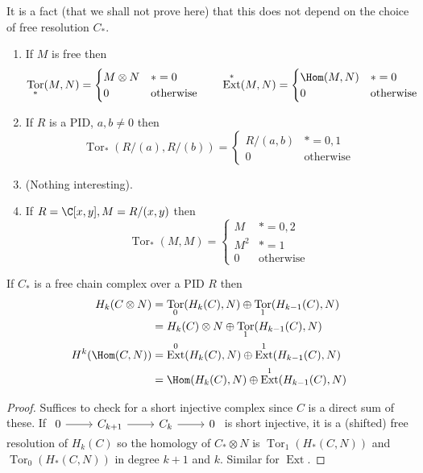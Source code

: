 \documentclass[a4paper]{article}
\DeclareMathOperator{\Tor}{Tor} %
\DeclareMathOperator{\Ext}{Ext} %
\begin{document}
It is a fact (that we shall not prove here) that this does not depend on the choice of free resolution \(C_*\).

\begin{eg}\leavevmode
  \begin{enumerate}
  \item If \(M\) is free then
    \[
      \Tor_*(M, N) =
      \begin{cases}
        M \otimes N & * = 0 \\
        0 & \text{otherwise}
      \end{cases}
      \qquad
      \Ext^*(M, N) =
      \begin{cases}
        \Hom(M, N) & * = 0 \\
        0 & \text{otherwise}
      \end{cases}
    \]
  \item If \(R\) is a PID, \(a, b \neq 0\) then
    \[
      \Tor_*(R/(a), R/(b)) =
      \begin{cases}
        R/(a, b) & * = 0, 1 \\
        0 & \text{otherwise}
      \end{cases}
    \]
  \item (Nothing interesting).
  \item If \(R = \C[x, y], M = R/(x, y)\) then
    \[
      \Tor_*(M, M) =
      \begin{cases}
        M & * = 0, 2 \\
        M^2 & * = 1 \\
        0 & \text{otherwise}
      \end{cases}
    \]
  \end{enumerate}
\end{eg}

\begin{proposition}
  If \(C_*\) is a free chain complex over a PID \(R\) then
  \begin{align*}
    H_k(C \otimes N) &= \Tor_0(H_k(C), N) \oplus \Tor_1(H_{k - 1}(C), N) \\
                     &= H_k(C) \otimes N \oplus \Tor_1(H_{k - 1}(C), N) \\
    H^k(\Hom(C, N)) &= \Ext^0(H_k(C), N) \oplus \Ext^1(H_{k - 1}(C), N) \\
                     &= \Hom(H_k(C), N) \oplus \Ext^1(H_{k - 1}(C), N)
  \end{align*}
\end{proposition}

\begin{proof}
  Suffices to check for a short injective complex since \(C\) is a direct sum of these. If \(
  \begin{tikzcd}
    0 \ar[r] & C_{k + 1} \ar[r] & C_k \ar[r] & 0
  \end{tikzcd}
  \) is short injective, it is a (shifted) free resolution of \(H_k(C)\) so the homology of \(C_* \otimes N\) is \(\Tor_1(H_*(C, N))\) and \(\Tor_0(H_*(C, N))\) in degree \(k + 1\) and \(k\). Similar for \(\Ext\).
\end{proof}
\end{document}
